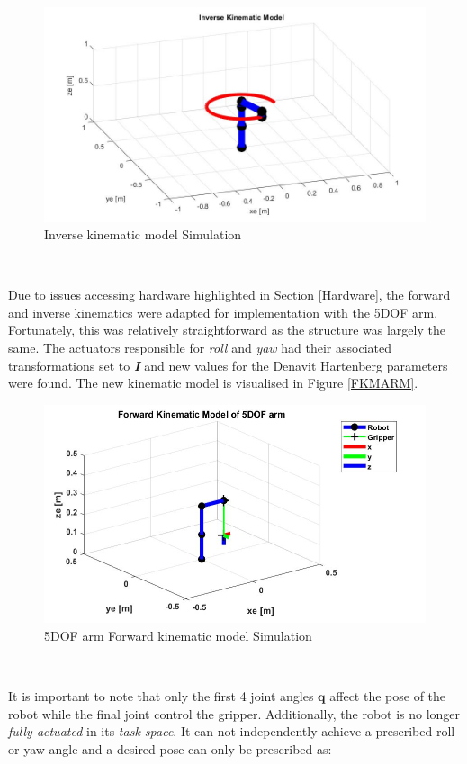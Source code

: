 \documentclass{UoNMCHA}
\numberwithin{equation}{section}
\begin{document}
\begin{figure}[H]
	\begin{center}
		\includegraphics[width=.8\linewidth]{Figures/ikmodel}
		\caption{Inverse kinematic model Simulation}
		\label{fig:ikmodel}
	\end{center}
\end{figure}\

Due to issues accessing hardware highlighted in Section \ref{Hardware}, the forward and inverse kinematics were adapted for implementation with the 5DOF arm. Fortunately, this was relatively straightforward as the structure was largely the same. The actuators responsible for \textit{roll} and \textit{yaw} had their associated transformations set to \textit{\textbf{I}} and new values for the Denavit Hartenberg parameters were found. The new kinematic model is visualised in Figure \ref{FKMARM}.


\begin{figure}[H]
	\begin{center}
		\includegraphics[width=.8\linewidth]{Figures/FKMARM}
		\caption{5DOF arm Forward kinematic model Simulation}
		\label{fig:FKMARM}
	\end{center}
\end{figure}\
  
It is important to note that only the first 4 joint angles $\mathbf{q}$ affect the pose of the robot while the final joint control the gripper. Additionally, the robot is no longer \textit{fully actuated} in its \textit{task space}. It can not independently achieve a prescribed roll or yaw angle and a desired pose can only be prescribed as:
\end{document}
